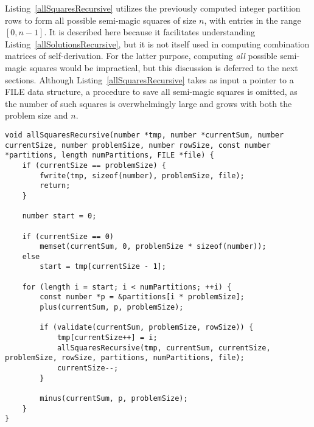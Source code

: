 Listing~\ref{allSquaresRecursive} utilizes the previously computed integer partition rows to form all possible semi-magic squares of size $n$, with entries in the range $[0, n - 1]$. It is described here because it facilitates understanding Listing~\ref{allSolutionsRecursive}, but it is not itself used in computing combination matrices of self-derivation. For the latter purpose, computing \emph{all} possible semi-magic squares would be impractical, but this discussion is deferred to the next sections. Although Listing~\ref{allSquaresRecursive} takes as input a pointer to a FILE data structure, a procedure to save all semi-magic squares is omitted, as the number of such squares is overwhelmingly large and grows with both the problem size and $n$.

\begin{lstlisting}[caption={Recursively computing all semi-magic squares of a certain size.},label={allSquaresRecursive}]
void allSquaresRecursive(number *tmp, number *currentSum, number currentSize, number problemSize, number rowSize, const number *partitions, length numPartitions, FILE *file) {
    if (currentSize == problemSize) {
        fwrite(tmp, sizeof(number), problemSize, file);
        return;
    }

    number start = 0;

    if (currentSize == 0)
        memset(currentSum, 0, problemSize * sizeof(number));
    else
        start = tmp[currentSize - 1];

    for (length i = start; i < numPartitions; ++i) {
        const number *p = &partitions[i * problemSize];
        plus(currentSum, p, problemSize);

        if (validate(currentSum, problemSize, rowSize)) {
            tmp[currentSize++] = i;
            allSquaresRecursive(tmp, currentSum, currentSize, problemSize, rowSize, partitions, numPartitions, file);
            currentSize--;
        }

        minus(currentSum, p, problemSize);
    }
}
\end{lstlisting}

